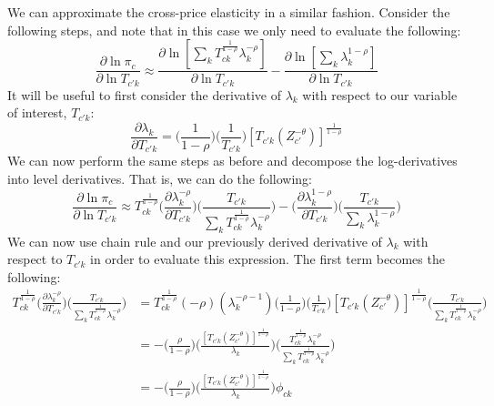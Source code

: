 \documentclass[12pt]{article}
\begin{document}
We can approximate the cross-price elasticity in a similar fashion. Consider the following steps, and note that in this case we only need to evaluate the following:
\begin{equation*}
    \frac{\partial\ln{\pi_{c}}}{\partial\ln{T_{{c'}k}}} \approx \frac{\partial\ln[{\sum\limits_{k}{T^{\frac{1}{1-\rho}}_{ck}}\lambda_{k}^{-\rho}}]}{\partial\ln{T_{{c'}k}}} - \frac{\partial\ln[{\sum\limits_{k}\lambda_{k}^{1-\rho}}]}{\partial\ln{T_{{c'}k}}}
\end{equation*}
It will be useful to first consider the derivative of $\lambda_{k}$ with respect to our variable of interest, $T_{{c'}k}$:
\begin{equation*}
    \frac{\partial{\lambda_{k}}}{\partial{T_{{c'}k}}} = \Big(\frac{1}{1-\rho}\Big)\Big(\frac{1}{T_{{c'}k}}\Big)[{T_{{c'}k}}(Z_{c'}^{-\theta})]^{\frac{1}{1-\rho}}
\end{equation*}
We can now perform the same steps as before and decompose the log-derivatives into level derivatives. That is, we can do the following:
\begin{equation*}
    \frac{\partial\ln{\pi_{c}}}{\partial\ln{T_{{c'}k}}} \approx {T^{\frac{1}{1-\rho}}_{ck}}\Big(\frac{\partial\lambda_{k}^{-\rho}}{\partial{T_{{c'}k}}}\Big)\Big(\frac{T_{{c'}k}}{{\sum\limits_{k}{T^{\frac{1}{1-\rho}}_{ck}}\lambda_{k}^{-\rho}}}\Big) - \Big(\frac{\partial\lambda_{k}^{1-\rho}}{\partial{T_{{c'}k}}}\Big)\Big(\frac{T_{{c'}k}}{{\sum\limits_{k}\lambda_{k}^{1-\rho}}}\Big)
\end{equation*}
We can now use chain rule and our previously derived derivative of $\lambda_{k}$ with respect to $T_{{c'}{k}}$ in order to evaluate this expression. The first term becomes the following:
\begin{align*}
    {T^{\frac{1}{1-\rho}}_{ck}}\Big(\frac{\partial\lambda_{k}^{-\rho}}{\partial{T_{{c'}k}}}\Big)\Big(\frac{T_{{c'}k}}{{\sum\limits_{k}{T^{\frac{1}{1-\rho}}_{ck}}\lambda_{k}^{-\rho}}}\Big) & = {T^{\frac{1}{1-\rho}}_{ck}}(-\rho)(\lambda_{k}^{-\rho-1})\Big(\frac{1}{1-\rho}\Big)\Big(\frac{1}{T_{{c'}k}}\Big)[{T_{{c'}k}}(Z_{c'}^{-\theta})]^{\frac{1}{1-\rho}}\Big(\frac{T_{{c'}k}}{{\sum\limits_{k}{T^{\frac{1}{1-\rho}}_{ck}}\lambda_{k}^{-\rho}}}\Big) \\ &= -\Bigg(\frac{\rho}{1-\rho}\Bigg)\Bigg(\frac{[{T_{{c'}k}}(Z_{c'}^{-\theta})]^{\frac{1}{1-\rho}}}{\lambda_{k}}\Bigg)\Bigg(\frac{T^{\frac{1}{1-\rho}}_{ck}{\lambda^{-\rho}_{k}}}{{\sum\limits_{k}{T^{\frac{1}{1-\rho}}_{ck}}\lambda_{k}^{-\rho}}}\Bigg)\\ &= -\Bigg(\frac{\rho}{1-\rho}\Bigg)\Bigg(\frac{[{T_{{c'}k}}(Z_{c'}^{-\theta})]^{\frac{1}{1-\rho}}}{\lambda_{k}}\Bigg){\phi_{ck}}
\end{align*}
\end{document}
